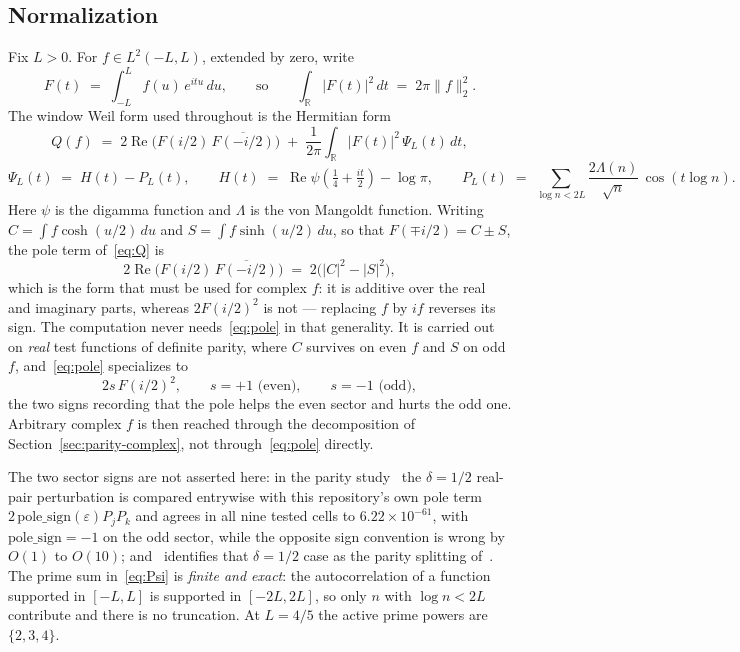\documentclass[11pt,a4paper]{article}
\theoremstyle{definition}
\theoremstyle{remark}
\newcommand{\PsiL}{\Psi_{L}}
\begin{document}
\subsection{Normalization}

Fix $L > 0$. For $f \in L^2(-L,L)$, extended by zero, write
\[
   F(t) \;=\; \int_{-L}^{L} f(u)\, e^{itu}\, du ,
   \qquad\text{so}\qquad
   \int_{\mathbb{R}} |F(t)|^2\, dt \;=\; 2\pi \|f\|_2^2 .
\]
The window Weil form used throughout is the Hermitian form
\begin{equation}
\label{eq:Q}
   Q(f) \;=\; 2\operatorname{Re}\!\big(F(i/2)\,\overline{F(-i/2)}\big)
     \;+\; \frac{1}{2\pi}\int_{\mathbb{R}} |F(t)|^2\, \PsiL(t)\, dt ,
\end{equation}
\begin{equation}
\label{eq:Psi}
   \PsiL(t) \;=\; H(t) - P_L(t), \qquad
   H(t) \;=\; \operatorname{Re}\psi\!\left(\tfrac14 + \tfrac{it}{2}\right) - \log\pi ,
   \qquad
   P_L(t) \;=\; \sum_{\log n < 2L} \frac{2\Lambda(n)}{\sqrt n}\,\cos(t \log n) .
\end{equation}
Here $\psi$ is the digamma function and $\Lambda$ is the von Mangoldt function.
Writing $C = \int f\cosh(u/2)\,du$ and $S = \int f\sinh(u/2)\,du$, so that
$F(\mp i/2) = C \pm S$, the pole term of~\eqref{eq:Q} is
\begin{equation}
\label{eq:pole}
   2\operatorname{Re}\!\big(F(i/2)\,\overline{F(-i/2)}\big)
   \;=\; 2\big(|C|^2 - |S|^2\big) ,
\end{equation}
which is the form that must be used for complex $f$: it is additive over the
real and imaginary parts, whereas $2F(i/2)^2$ is not --- replacing $f$ by $if$
reverses its sign. The computation never needs~\eqref{eq:pole} in that
generality. It is carried out on \emph{real} test functions of definite parity,
where $C$ survives on even $f$ and $S$ on odd $f$, and~\eqref{eq:pole}
specializes to
\[
   2 s\, F(i/2)^2 , \qquad s = +1 \text{ (even)}, \qquad s = -1 \text{ (odd)} ,
\]
the two signs recording that the pole helps the even sector and hurts the odd
one. Arbitrary complex $f$ is then reached through the decomposition of
Section~\ref{sec:parity-complex}, not through~\eqref{eq:pole} directly.

The two sector signs are not asserted here: in the
parity study~\cite[\S3(c)]{ParityNote} the $\delta = 1/2$ real-pair perturbation
is compared entrywise with this repository's own pole term
$2\,\mathrm{pole\_sign}(\varepsilon)P_jP_k$ and agrees in all nine tested cells to
$6.22\times10^{-61}$, with $\mathrm{pole\_sign} = -1$ on the odd sector, while
the opposite sign convention is wrong by $O(1)$ to $O(10)$;
and~\cite[Remark 6]{ParityNote} identifies that $\delta = 1/2$ case as the parity
splitting of~\cite[Lemma 6.1]{Zhu}. The prime sum in~\eqref{eq:Psi} is
\emph{finite and exact}: the autocorrelation of a function supported in
$[-L,L]$ is supported in $[-2L,2L]$, so only $n$ with $\log n < 2L$ contribute
and there is no truncation. At $L = 4/5$ the active prime powers are
$\{2,3,4\}$.
\end{document}
